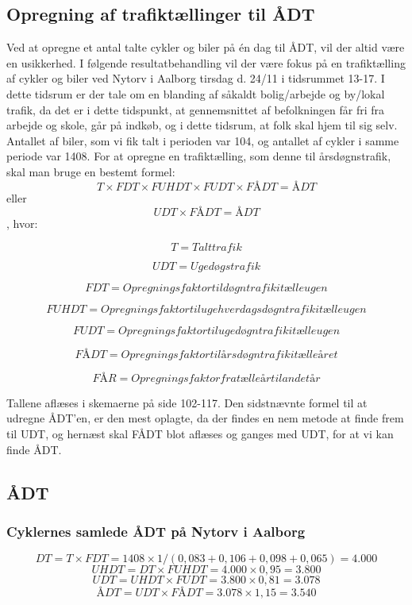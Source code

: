 \subsection{Opregning af trafiktællinger til ÅDT}
\label{sub:opregning}
Ved at opregne et antal talte cykler og biler på én dag til ÅDT, vil der altid være en usikkerhed.
I følgende resultatbehandling vil der være fokus på en trafiktælling af cykler og biler ved Nytorv i Aalborg tirsdag d. 24/11 i tidsrummet 13-17. I dette tidsrum er der tale om en blanding af såkaldt bolig/arbejde og by/lokal trafik, da det er i dette tidspunkt, at gennemsnittet af befolkningen får fri fra arbejde og skole, går på indkøb, og i dette tidsrum, at folk skal hjem til sig selv.
Antallet af biler, som vi fik talt i perioden var 104, og antallet af cykler i samme periode var 1408.
For at opregne en trafiktælling, som denne til årsdøgnstrafik, skal man bruge en bestemt formel:
$$ T \times FDT \times FUHDT \times FUDT \times FÅDT = ÅDT $$ eller $$ UDT \times FÅDT = ÅDT$$ , hvor:

$$T = Talt trafik$$

$$UDT = Ugedøgstrafik$$

$$FDT = Opregningsfaktor til døgntrafik i tælleugen$$

$$FUHDT = Opregningsfaktor til ugehverdagsdøgntrafik i tælleugen$$

$$FUDT = Opregningsfaktor til ugedøgntrafik i tælleugen$$

$$FÅDT = Opregningsfaktor til årsdøgntrafik i tælleåret$$

$$FÅR = Opregningsfaktor fra tælleår til andet år$$

Tallene aflæses i skemaerne på side 102-117. Den sidstnævnte formel til at udregne ÅDT’en, er den mest oplagte, da der findes en nem metode at finde frem til UDT, og hernæst skal FÅDT blot aflæses og ganges med UDT, for at vi kan finde ÅDT.

\subsection{ÅDT}
\label{AEDT}
\subsubsection{Cyklernes samlede ÅDT på Nytorv i Aalborg}
$$DT = T \times FDT = 1408 \times 1/(0,083+0,106+0,098+0,065) = 4.000$$
$$UHDT = DT \times FUHDT = 4.000 \times 0,95 = 3.800$$
$$UDT = UHDT \times FUDT = 3.800 \times 0,81 = 3.078$$
$$ÅDT = UDT \times FÅDT = 3.078 \times 1,15 = 3.540$$
